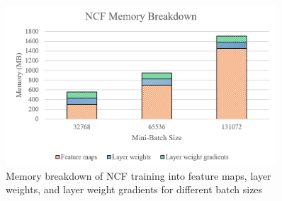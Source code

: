 \documentclass[12pt,letterpaper]{article}
\begin{document}
\begin{figure}[H]
\centering
\includegraphics[width=0.9\textwidth]{recommendation_bar_graphs.PNG}
\captionsetup{width=0.8\linewidth}
\caption{Memory breakdown of NCF training into feature maps, layer weights, and layer weight gradients for different batch sizes}
\label{fig:recommendation_bar_graph}
\end{figure}
\end{document}
